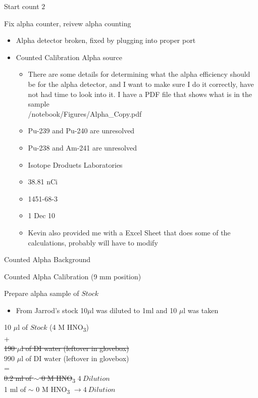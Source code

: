 \documentclass[idxtotoc,hyperref,openany,oneside]{labbook} %
\newcommand{\cmark}{\ding{51}}%
\newcommand{\done}{\rlap{$\square$}{\raisebox{2pt}{\large\hspace{1pt}\cmark}}%
  \hspace{-2.5pt}}
\newcommand{\tsbs}{\textsubscript}
\begin{document}
\begin{todolist}
\item[\done]{Start count $\boxed{2}$}
\item[\done]{Fix alpha counter, reivew alpha counting}
  \begin{itemize}
  \item{Alpha detector broken, fixed by plugging into proper port}
  \item{Counted Calibration Alpha source}
    \begin{itemize}
    \item{There are some details for determining
      what the alpha efficiency should be for the alpha
      detector, and I want to make sure I do it correctly,
      have not had time to look into it. I have a PDF file
      that shows what is in the sample\\
      /notebook/Figures/Alpha\_Copy.pdf}
    \item{Pu-239 and Pu-240 are unresolved}
    \item{Pu-238 and Am-241 are unresolved}
    \item{Isotope Droduets Laboratories}
    \item{38.81 nCi}
    \item{1451-68-3}
    \item{1 Dec 10}
    \item{Kevin also provided me with a Excel Sheet that does
      some of the calculations, probably will have to modify}
    \end{itemize}
  \end{itemize}
\item[\done]{Counted Alpha Background}
\item[\done]{Counted Alpha Calibration (9 mm position)}
\item[\done]{Prepare alpha sample of $\boxed{Stock}$}
  \begin{itemize}
    \item{From Jarrod's stock 10$\mu$l was diluted to 1ml
    and 10 $\mu$l was taken}
  \end{itemize}
\end{todolist}
\begin{center}
10 $\mu$l of $\boxed{Stock}$ (4 M HNO\tsbs{3})\\
+\\
\st{190 $\mu$l of DI water (leftover in glovebox)}\\
990 $\mu$l of DI water (leftover in glovebox)\\
=\\
\st{0.2 ml of $\sim$ 0 M HNO}\tsbs{3}\st{ $\boxed{4\ Dilution}$}\\
1 ml of $\sim$ 0 M HNO\tsbs{3} $\rightarrow\boxed{4\ Dilution}$
\end{center}
\end{document}
